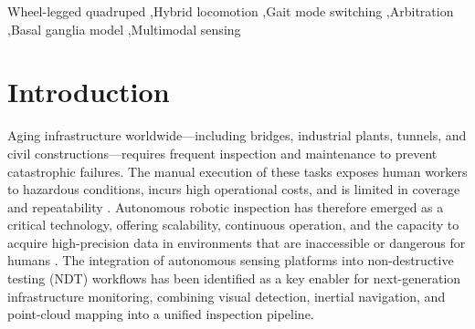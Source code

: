 \documentclass[preprint,12pt]{elsarticle}
\begin{document}
\begin{frontmatter}
\begin{keyword}

Wheel-legged quadruped \sep Hybrid locomotion \sep Gait mode switching \sep Arbitration \sep Basal ganglia model \sep Multimodal sensing

\end{keyword}

\end{frontmatter}



\section{Introduction}

Aging infrastructure worldwide---including bridges, industrial plants, tunnels, and civil constructions---requires frequent inspection and maintenance to prevent catastrophic failures. The manual execution of these tasks exposes human workers to hazardous conditions, incurs high operational costs, and is limited in coverage and repeatability \citep{Halder2023Construction,Wang2025Autonomous}. Autonomous robotic inspection has therefore emerged as a critical technology, offering scalability, continuous operation, and the capacity to acquire high-precision data in environments that are inaccessible or dangerous for humans \citep{Halder2025Crack}. The integration of autonomous sensing platforms into non-destructive testing (NDT) workflows has been identified as a key enabler for next-generation infrastructure monitoring, combining visual detection, inertial navigation, and point-cloud mapping into a unified inspection pipeline.
\end{document}

